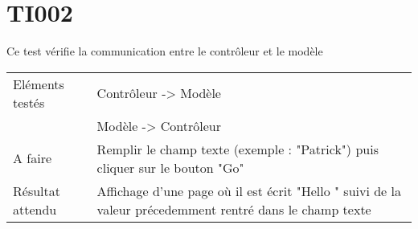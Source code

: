 
\section{TI002}
	Ce test vérifie la communication entre le contrôleur et le modèle
	\begin{center}
     	\begin{tabular}[h]{|p{}|p{}|}
		\hline
			Eléments testés & Contrôleur -> Modèle \\
						    &  Modèle -> Contrôleur \\\hline
    			A faire & Remplir le champ texte (exemple : "Patrick") puis cliquer sur le bouton "Go" \\\hline
    			Résultat attendu & Affichage d'une page où il est écrit "Hello " suivi de la valeur précedemment rentré dans le champ texte \\\hline
     	\end{tabular}
  	\end{center}	